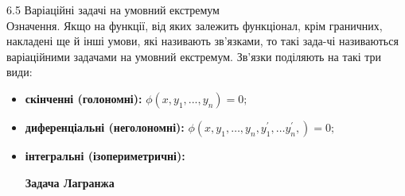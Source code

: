 \documentclass[a4paper]{article}
\begin{document}
6.5 Варіаційні задачі на умовний екстремум\\

Означення. Якщо на функції, від яких залежить функціонал, крім граничних, накладені ще й інші умови,
які називають зв’язками, то такі зада-чі називаються варіаційними задачами на умовний екстремум.
Зв’язки поділяють на такі три види: 
\begin{itemize}
\item \textbf{скінченні (голономні):} $\phi(x, y_1, ..., y_n)=0;$
\item \textbf{диференціальні (неголономні):}
	$\phi(x, y_1, \ldots, y_n, y^{'}_1,\ldots y^{'}_n,)=0;$
\item \textbf{інтегральні (ізопериметричні):}

\begin{center}
\textbf{Задача Лагранжа}
\end{center} 
\end{itemize}
\end{document}
